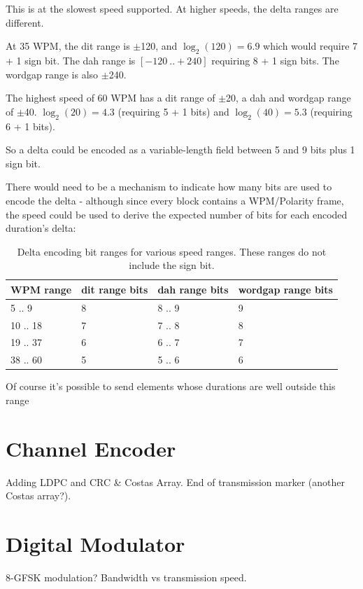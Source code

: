 \documentclass[a4paper]{tufte-handout}
\begin{document}
This is at the slowest speed supported. At higher speeds, the delta ranges are different. 

At 35 WPM, the dit range is $\pm$120, and $\log_2\left(120\right) = 6.9$ which would require 7 + 1 sign bit. The dah range is $[-120 ~.. +240]$ requiring 8 + 1 sign bits. The wordgap range is also $\pm$240.

The highest speed of 60 WPM has a dit range of $\pm$20, a dah and wordgap range of $\pm$40. $\log_2\left(20\right) = 4.3$ (requiring 5 + 1 bits) and $\log_2\left(40\right) = 5.3$ (requiring 6 + 1 bits).

So a delta could be encoded as a variable-length field between 5 and 9 bits plus 1 sign bit.

There would need to be a mechanism to indicate how many bits are used to encode the delta - although since every block contains a WPM/Polarity frame, the speed could be used to derive the expected number of bits for each encoded duration's delta: 
    \begin{table}[h]
        \selectfont
        \begin{tabular}{llll}
            \toprule
            WPM range & dit range bits & dah range bits & wordgap range bits \\
            \midrule
            5 .. 9    & 8              & 8 .. 9         & 9 \\
            10 .. 18  & 7              & 7 .. 8         & 8 \\
            19 .. 37  & 6              & 6 .. 7         & 7 \\
            38 .. 60  & 5              & 5 .. 6         & 6 \\
		\end{tabular}
		\caption{Delta encoding bit ranges for various speed ranges. These ranges do not include the sign bit.}
		\label{table:delta-encoding-bit-ranges}
	\end{table}


Of course it's possible to send elements whose durations are well outside this range



\section{Channel Encoder}
Adding LDPC and CRC \& Costas Array. End of transmission marker (another Costas array?).

\section{Digital Modulator}
8-GFSK modulation? Bandwidth vs transmission speed.
\end{document}
